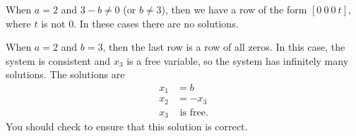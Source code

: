 \begin{example}
\item When $a=2$ and $3-b \neq 0$ (or $b \neq 3$), then we have a row of the form $[0 \ 0 \ 0 \ t]$, where $t$ is not $0$. In these cases there are no solutions.
\item When $a=2$ and $b = 3$, then the last row is a row of all zeros. In this case, the system is consistent and $x_3$ is a free variable, so the system has infinitely many solutions. The solutions are 
\begin{align*}
x_1 &= b \\
x_2 &= -x_3 \\
x_3 &\text{ is free.}
\end{align*}
You should check to ensure that this solution is correct.
\ea

 \end{example}


